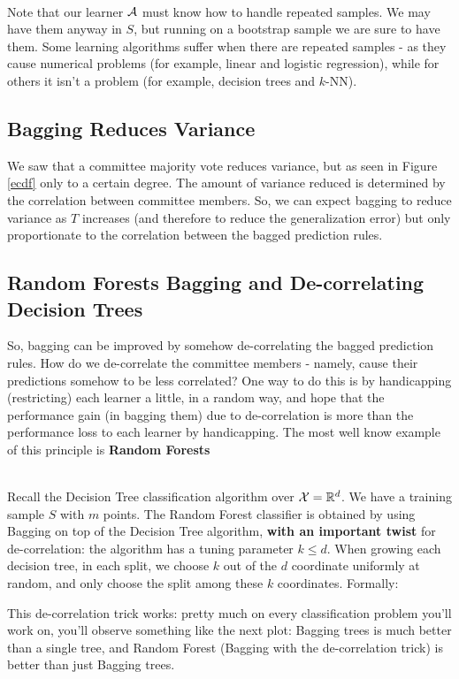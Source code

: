 ~\\
Note that our learner $\mathcal{A}$ must know how to handle repeated samples. We may have them anyway in $S$, but running on a bootstrap sample we are sure to have them. Some
learning algorithms suffer when there are repeated samples - as they cause numerical problems (for example, linear and logistic regression), while for others it isn't a problem (for example, decision trees and $k$-NN).

\subsection{Bagging Reduces Variance}
We saw that a committee majority vote reduces variance, but as seen in Figure \ref{ecdf} only to a certain degree. The amount of variance reduced is determined by the correlation between committee members. So, we can expect bagging to reduce variance as $T$ increases (and therefore to reduce the generalization error) but only proportionate to the correlation between the bagged prediction rules.

\subsection{Random Forests Bagging and De-correlating Decision Trees}
So, bagging can be improved by somehow de-correlating the bagged prediction rules. How do we de-correlate the committee members - namely, cause their predictions somehow to be less correlated? One way to do this is by handicapping (restricting) each learner a little, in a random way, and hope that the performance gain (in bagging them) due to de-correlation is more than the performance loss to each learner by handicapping. The most well know example of this principle is \textbf{Random Forests}

~\\
Recall the Decision Tree classification algorithm over $\mathcal{X}=\mathbb{R}^d$. We have a training sample $S$ with $m$ points. The Random Forest classifier is obtained by using Bagging on top of the Decision Tree algorithm, \textbf{with an important twist} for de-correlation: the algorithm has a tuning parameter $k\leq d$. When growing each decision tree, in each split, we choose $k$ out of the $d$ coordinate uniformly at random, and only choose the split among these $k$ coordinates. Formally:


This de-correlation trick works: pretty much on every classification problem you'll work on, you'll observe something like the next plot: Bagging trees is
much better than a single tree, and Random Forest (Bagging with the de-correlation trick) is better than just Bagging trees.

